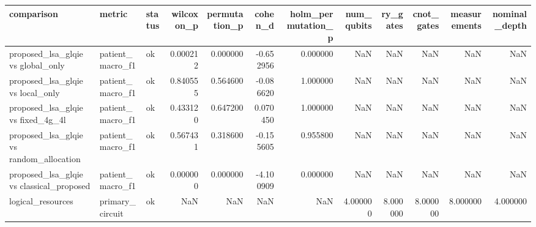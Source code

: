 \begin{tabular}{lllrrrrrrrrr}
\toprule
comparison & metric & status & wilcoxon_p & permutation_p & cohen_d & holm_permutation_p & num_qubits & ry_gates & cnot_gates & measurements & nominal_depth \\
\midrule
proposed_lsa_glqie vs global_only & patient_macro_f1 & ok & 0.000212 & 0.000000 & -0.652956 & 0.000000 & NaN & NaN & NaN & NaN & NaN \\
proposed_lsa_glqie vs local_only & patient_macro_f1 & ok & 0.840555 & 0.564600 & -0.086620 & 1.000000 & NaN & NaN & NaN & NaN & NaN \\
proposed_lsa_glqie vs fixed_4g_4l & patient_macro_f1 & ok & 0.433120 & 0.647200 & 0.070450 & 1.000000 & NaN & NaN & NaN & NaN & NaN \\
proposed_lsa_glqie vs random_allocation & patient_macro_f1 & ok & 0.567431 & 0.318600 & -0.155605 & 0.955800 & NaN & NaN & NaN & NaN & NaN \\
proposed_lsa_glqie vs classical_proposed & patient_macro_f1 & ok & 0.000000 & 0.000000 & -4.100909 & 0.000000 & NaN & NaN & NaN & NaN & NaN \\
logical_resources & primary_circuit & ok & NaN & NaN & NaN & NaN & 4.000000 & 8.000000 & 8.000000 & 8.000000 & 4.000000 \\
\bottomrule
\end{tabular}
